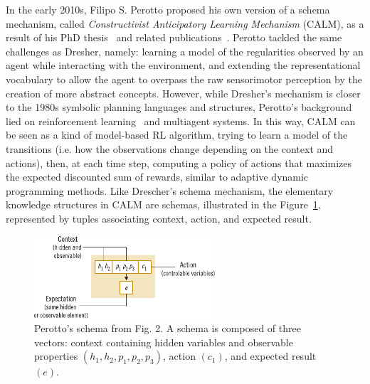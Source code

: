 \documentclass[runningheads]{llncs}
\begin{document}
In the early 2010s, Filipo S. Perotto proposed his own version of a schema mechanism, called \textit{Constructivist Anticipatory Learning Mechanism} (CALM), as a result of his PhD thesis~\cite{Perotto:2010:UFRGS,Perotto:2010:INP} and related publications~\cite{Perotto:2013:CF,Perotto:2006:SGAI,Perotto:2006:AAMAS,Perotto:2007:EpiRob}.
Perotto tackled the same challenges as Dresher, namely: learning a model of the regularities observed by an agent while interacting with the environment, and extending the representational vocabulary to allow the agent to overpass the raw sensorimotor perception by the creation of more abstract concepts.
However, while Dresher's mechanism is closer to the 1980s symbolic planning languages and structures, Perotto's background lied on reinforcement learning~\cite{Sutton:2018} and multiagent systems.
In this way, CALM can be seen as a kind of model-based RL algorithm, trying to learn a model of the transitions (i.e. how the observations change depending on the context and actions), then, at each time step, computing a policy of actions that maximizes the expected discounted sum of rewards, similar to adaptive dynamic programming methods.
Like Drescher's schema mechanism, the elementary knowledge structures in CALM are schemas, illustrated in the Figure~\ref{fig:perotto_schema}, represented by tuples associating context, action, and expected result.

\begin{figure}
	\centering
	\includegraphics[width=0.6\textwidth]{Figure_4_CALM_schema.pdf}
	\caption{Perotto's schema from \cite{Perotto:2013:CF} Fig. 2.
		A schema is composed of three vectors: context containing hidden variables and observable properties $(h_1, h_2, p_1, p_2, p_3)$, action $(c_1)$, and expected result $(e)$. } 
	\label{fig:perotto_schema}
\end{figure}
\end{document}
